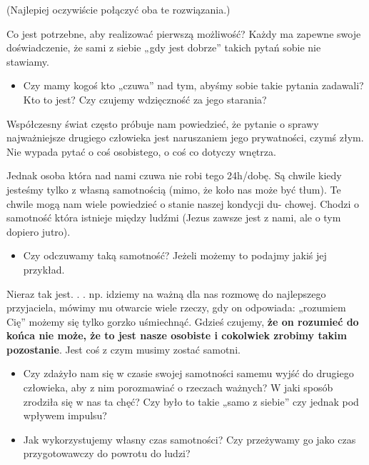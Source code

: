 \documentclass[a5paper,10pt,polish]{book}
\begin{document}
\begin{DUlineblock}{0em}
\item[] (Najlepiej oczywiście połączyć oba te rozwiązania.)
\item[] Co jest  potrzebne, aby realizować pierwszą możliwość? Każdy ma zapewne swoje doświadczenie,  że sami z siebie „gdy jest dobrze” takich pytań sobie nie stawiamy.
\end{DUlineblock}
\begin{itemize}
\item {} 
Czy mamy kogoś kto „czuwa” nad tym, abyśmy sobie takie pytania zadawali? Kto  to jest? Czy czujemy wdzięczność za jego starania?

\end{itemize}

Współczesny świat często próbuje nam powiedzieć,  że pytanie o sprawy najważniejsze drugiego człowieka jest naruszaniem jego prywatności, czymś złym. Nie wypada pytać o coś osobistego,  o coś co dotyczy wnętrza.

Jednak osoba która nad nami czuwa nie robi tego 24h/dobę. Są chwile kiedy jesteśmy  tylko  z własną samotnością (mimo, że koło nas może być tłum).  Te chwile mogą nam wiele powiedzieć o stanie naszej kondycji du- chowej. Chodzi o samotność która istnieje między ludźmi (Jezus zawsze jest z nami, ale o tym dopiero jutro).
\begin{itemize}
\item {} 
Czy odczuwamy taką samotność? Jeżeli możemy to podajmy jakiś jej przykład.

\end{itemize}

Nieraz tak jest. . . np. idziemy na ważną dla nas rozmowę do najlepszego przyjaciela, mówimy mu otwarcie wiele rzeczy, gdy on odpowiada: „rozumiem Cię” możemy  się tylko gorzko uśmiechnąć. Gdzieś czujemy, \textbf{że on rozumieć do końca nie może, że to jest nasze osobiste i cokolwiek zrobimy takim  pozostanie}. Jest coś z czym musimy zostać samotni.
\begin{itemize}
\item {} 
Czy zdażyło nam się w czasie swojej samotności samemu wyjść  do drugiego człowieka,  aby  z nim  porozmawiać o rzeczach ważnych? W  jaki  sposób zrodziła  się w nas ta  chęć? Czy było to takie  „samo z siebie” czy jednak  pod wpływem impulsu?

\item {} 
Jak wykorzystujemy własny czas samotności?  Czy przeżywamy go jako czas przygotowawczy  do powrotu do ludzi?

\end{itemize}
\end{document}
